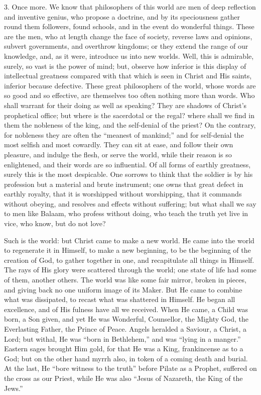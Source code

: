 3. Once more. We know that philosophers of this world are men of
deep reflection and inventive genius, who propose a doctrine, and by
its speciousness gather round them followers, found schools, and in
the event do wonderful things. These are the men, who at length change
the face of society, reverse laws and opinions, subvert governments,
and overthrow kingdoms; or they extend the range of our knowledge,
and, as it were, introduce us into new worlds. Well, this is
admirable, surely, so vast is the power of mind; but, observe how
inferior is this display of intellectual greatness compared with that
which is seen in Christ and His saints, inferior because defective.
These great philosophers of the world, whose words are so good and so
effective, are themselves too often nothing more than words. Who shall
warrant for their doing as well as speaking? They are shadows of
Christ's prophetical office; but where is the sacerdotal or the regal?
where shall we find in them the nobleness of the king, and the
self-denial of the priest? On the contrary, for nobleness they are
often the ``meanest of mankind;'' and for self-denial the most
selfish and most cowardly. They can sit at ease, and follow their own
pleasure, and indulge the flesh, or serve the world, while their
reason is so enlightened, and their words are so influential. Of all
forms of earthly greatness, surely this is the most despicable. One
sorrows to think that the soldier is by his profession but a material
and brute instrument; one owns that great defect in earthly royalty,
that it is worshipped without worshipping, that it commands without
obeying, and resolves and effects without suffering; but what shall we
say to men like Balaam, who profess without doing, who teach the truth
yet live in vice, who know, but do not love?

Such is the world: but Christ came to make a new world. He came
into the world to regenerate it in Himself, to make a new beginning,
to be the beginning of the creation of God, to gather together in one,
and recapitulate all things in Himself. The rays of His glory were
scattered through the world; one state of life had some of them,
another others. The world was like some fair mirror, broken in pieces,
and giving back no one uniform image of its Maker. But He came to
combine what was dissipated, to recast what was shattered in Himself.
He began all excellence, and of His fulness have all we received. When
He came, a Child was born, a Son given, and yet He was Wonderful,
Counsellor, the Mighty God, the Everlasting Father, the Prince of
Peace. Angels heralded a Saviour, a Christ, a Lord; but withal, He was
``born in Bethlehem,'' and was ``lying in a manger.''
Eastern sages brought Him gold, for that He was a King, frankincense
as to a God; but on the other hand myrrh also, in token of a coming
death and burial. At the last, He ``bore witness to the
truth'' before Pilate as a Prophet, suffered on the cross as our
Priest, while He was also ``Jesus of Nazareth, the King of the
Jews.''

